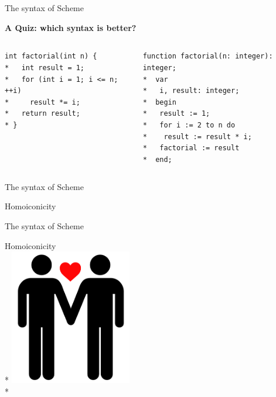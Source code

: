 \documentclass{beamer}
\begin{document}
\begin{frame}{The syntax of Scheme}

  \textbf{A Quiz: which syntax is better?}
  
  \begin{columns}[T] %
    \begin{column}{.48\textwidth}
      \begin{small}
        \texttt{int factorial(int n) \{\\*
            \ \ int result = 1;\\*
            \ \ for (int i = 1; i <= n; ++i)\\*
            \ \ \ \ result *= i;\\*
            \ \ return result;\\*
            \}}
      \end{small}
    \end{column}%
    \hfill%
    \begin{column}{.48\textwidth}
      \begin{small}
        \texttt{function factorial(n: integer): integer;\\*
          \ var\\*
          \ \ i, result: integer;\\*
          \ begin\\*
          \ \ result := 1;\\*
          \ \ for i := 2 to n do\\*
          \ \ \ result := result * i;\\*
          \ \ factorial := result\\*
          \ end;}
       \end{small}
    \end{column}%
  \end{columns}  
\end{frame}


\begin{frame}{The syntax of Scheme}
  \begin{center}
    \huge{Homoiconicity}
  \end{center}
\end{frame}

\begin{frame}{The syntax of Scheme}
  \begin{center}
    \huge{Homoiconicity}\\*
    \includegraphics[width=0.4\textwidth]{homoiconic.png}\\*
  \end{center}
\end{frame}
\end{document}
